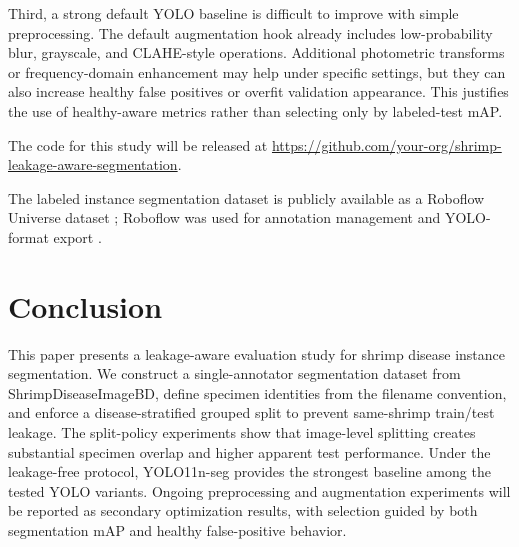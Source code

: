 \documentclass{svproc}
\begin{document}
Third, a strong default YOLO baseline is difficult to improve with
simple preprocessing. The default augmentation hook already includes
low-probability blur, grayscale, and CLAHE-style operations. Additional
photometric transforms or frequency-domain enhancement may help under
specific settings, but they can also increase healthy false positives or
overfit validation appearance. This justifies the use of healthy-aware
metrics rather than selecting only by labeled-test mAP.

The code for this study will be released at
\url{https://github.com/your-org/shrimp-leakage-aware-segmentation}.

The labeled instance segmentation dataset is publicly available as a Roboflow Universe dataset \cite{nguyen2026shrimpseg}; Roboflow was used for annotation management and YOLO-format export \cite{roboflow}.
\section{Conclusion}

This paper presents a leakage-aware evaluation study for shrimp disease
instance segmentation. We construct a single-annotator segmentation
dataset from ShrimpDiseaseImageBD, define specimen identities from the
filename convention, and enforce a disease-stratified grouped split to
prevent same-shrimp train/test leakage. The split-policy experiments
show that image-level splitting creates substantial specimen overlap and
higher apparent test performance. Under the leakage-free protocol,
YOLO11n-seg provides the strongest baseline among the tested YOLO
variants. Ongoing preprocessing and augmentation experiments will be
reported as secondary optimization results, with selection guided by
both segmentation mAP and healthy false-positive behavior.




\end{document}
